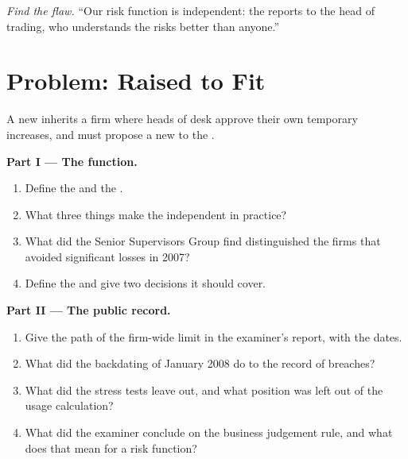 \begin{exercise}[$\star\star\star$]\label{exo:fm:the-risk-management-function:8}
\emph{Find the flaw.} ``Our risk function is independent: the  reports to the head of trading, who understands the risks better
than anyone.''
\end{exercise}

\section{Problem: Raised to Fit}

\begin{problem}\label{pb:fm:the-risk-management-function:1}
A new  inherits a firm where heads of desk approve their own temporary increases, and must propose a new 
to the .

\medskip\noindent\textbf{Part I --- The function.}
\begin{enumerate}
\item Define the  and the .
\item What three things make the  independent in practice?
\item What did the Senior Supervisors Group find distinguished the firms that avoided significant losses in 2007?
\item Define the  and give two decisions it should cover.
\end{enumerate}

\medskip\noindent\textbf{Part II --- The public record.}
\begin{enumerate}[resume]
\item Give the path of the firm-wide limit in the examiner's report, with the dates.
\item What did the backdating of January 2008 do to the record of breaches?
\item What did the stress tests leave out, and what position was left out of the usage calculation?
\item What did the examiner conclude on the business judgement rule, and what does that mean for a risk function?
\end{enumerate}


\end{problem}
